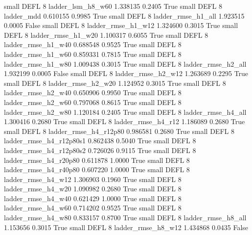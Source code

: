      small     DEFL                 8        ladder_lsm_h8_w60   1.338135      0.2405    True
     small     DEFL                 8               ladder_mdd   0.610155      0.9985    True
     small     DEFL                 8       ladder_rmse_h1_all   1.923515      0.0005   False
     small     DEFL                 8       ladder_rmse_h1_w12   1.324600      0.3015    True
     small     DEFL                 8       ladder_rmse_h1_w20   1.100317      0.6055    True
     small     DEFL                 8       ladder_rmse_h1_w40   0.688548      0.9525    True
     small     DEFL                 8       ladder_rmse_h1_w60   0.859331      0.7815    True
     small     DEFL                 8       ladder_rmse_h1_w80   1.009438      0.3015    True
     small     DEFL                 8       ladder_rmse_h2_all   1.932199      0.0005   False
     small     DEFL                 8       ladder_rmse_h2_w12   1.263689      0.2295    True
     small     DEFL                 8       ladder_rmse_h2_w20   1.124952      0.3015    True
     small     DEFL                 8       ladder_rmse_h2_w40   0.650906      0.9950    True
     small     DEFL                 8       ladder_rmse_h2_w60   0.797068      0.8615    True
     small     DEFL                 8       ladder_rmse_h2_w80   1.120184      0.2405    True
     small     DEFL                 8       ladder_rmse_h4_all   1.300416      0.2680    True
     small     DEFL                 8       ladder_rmse_h4_r12   1.186089      0.2680    True
     small     DEFL                 8    ladder_rmse_h4_r12p80   0.986581      0.2680    True
     small     DEFL                 8  ladder_rmse_h4_r12p80s1   0.862438      0.5040    True
     small     DEFL                 8  ladder_rmse_h4_r12p80s2   0.726026      0.9115    True
     small     DEFL                 8    ladder_rmse_h4_r20p80   0.611878      1.0000    True
     small     DEFL                 8    ladder_rmse_h4_r40p80   0.607220      1.0000    True
     small     DEFL                 8       ladder_rmse_h4_w12   1.306903      0.1960    True
     small     DEFL                 8       ladder_rmse_h4_w20   1.090982      0.2680    True
     small     DEFL                 8       ladder_rmse_h4_w40   0.621429      1.0000    True
     small     DEFL                 8       ladder_rmse_h4_w60   0.714202      0.9525    True
     small     DEFL                 8       ladder_rmse_h4_w80   0.833157      0.8700    True
     small     DEFL                 8       ladder_rmse_h8_all   1.153656      0.3015    True
     small     DEFL                 8       ladder_rmse_h8_w12   1.434868      0.0435   False
